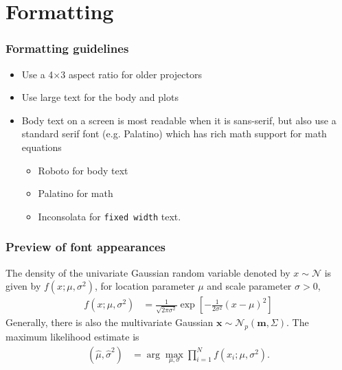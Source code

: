 \section{Formatting}


\begin{frame}
  \frametitle{Formatting guidelines}
    \begin{itemize}
    \item Use a 4$\times$3 aspect ratio for older projectors
    \item Use \large{large} \normalsize text for the body and plots
  \item Body text on a screen is most readable when it is sans-serif,
    but also use a standard serif font (e.g. Palatino) which has rich
    math support for math equations
    \begin{itemize}
    \item Roboto for body text
    \item Palatino for math
    \item Inconsolata for \texttt{fixed width} text.
    \end{itemize}
  \end{itemize}
  \cite*{horseshoe}
\end{frame}


\begin{frame}
  \frametitle{Preview of font appearances}

  The density of the univariate Gaussian random variable denoted by
  $x \sim \mathcal{N}$ is given by $f(x; \mu, \sigma^2)$, for location
  parameter $\mu$ and scale parameter $\sigma > 0$,
%
  \begin{align*}
    f(x; \mu, \sigma^2) &= \frac{1}{\sqrt{2\pi\sigma^2}} \exp 
           \left[
           -\frac{1}{2\sigma^2}(x - \mu)^2
           \right]
  \end{align*}
%
  Generally, there is also the multivariate Gaussian
  $\mathbf{x} \sim \mathcal{N}_p(\mathbf{m}, \Sigma)$. The maximum
  likelihood estimate is
  \begin{align*}
    (\hat{\mu}, \hat{\sigma}^2) &= \arg \max_{\mu, \sigma} \prod_{i=1}^N f(x_i; \mu, \sigma^2).
  \end{align*}
  
\end{frame}



